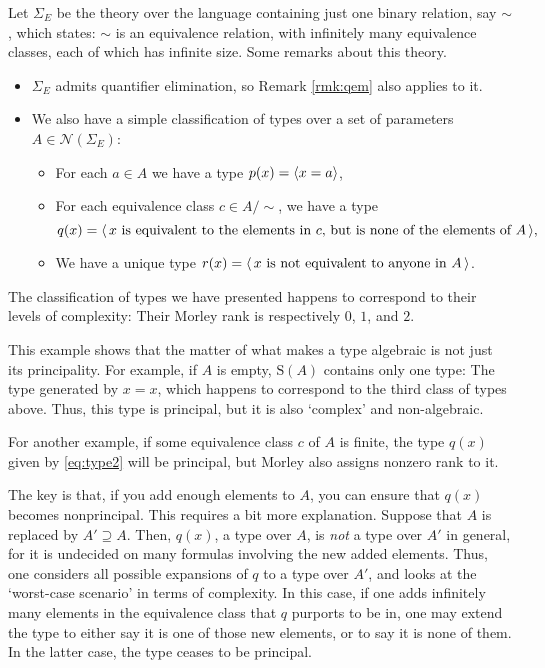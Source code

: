 \documentclass{article}
\theoremstyle{nonumberplain}
\newcommand{\calN}{\mathcal{N}}
\newcommand{\Stone}{\mathrm{S}}
\DeclarePairedDelimiter{\braket}{\langle}{\rangle}
\begin{document}
Let $\Sigma_E$ be the theory over the language containing just one binary relation, say $\sim$, which states: $\sim$ is an equivalence relation, with infinitely many equivalence classes, each of which has infinite size. Some remarks about this theory.
\begin{itemize}
\item $\Sigma_E$ admits quantifier elimination, so Remark \ref{rmk:qem} also applies to it.
\item We also have a simple classification of types over a set of parameters $A \in \calN(\Sigma_E)$:
\begin{itemize}
\item For each $a \in A$ we have a type $p(x) = \braket{x = a}$,
\item For each equivalence class $c \in A/{\sim}$, we have a type
\begin{equation}\label{eq:type2}
q(x) = \braket{\,\text{$x$ is equivalent to the elements in $c$, but is none of the elements of $A$}\,},
\end{equation}
\item We have a unique type $r(x) = \braket{\,\text{$x$ is not equivalent to anyone in $A$}\,}$.
\end{itemize}
\end{itemize}

The classification of types we have presented happens to correspond to their levels of complexity: Their Morley rank is respectively $0$, $1$, and $2$.

This example shows that the matter of what makes a type algebraic is not just its principality. For example, if $A$ is empty, $\Stone(A)$ contains only one type: The type generated by $x = x$, which happens to correspond to the third class of types above. Thus, this type is principal, but it is also `complex' and non-algebraic.

For another example, if some equivalence class $c$ of $A$ is finite, the type $q(x)$ given by \eqref{eq:type2} will be principal, but Morley also assigns nonzero rank to it.

The key is that, if you add enough elements to $A$, you can ensure that $q(x)$ becomes nonprincipal. This requires a bit more explanation. Suppose that $A$ is replaced by $A' \supseteq A$. Then, $q(x)$, a type over $A$, is \emph{not} a type over $A'$ in general, for it is undecided on many formulas involving the new added elements. Thus, one considers all possible expansions of $q$ to a type over $A'$, and looks at the `worst-case scenario' in terms of complexity. In this case, if one adds infinitely many elements in the equivalence class that $q$ purports to be in, one may extend the type to either say it is one of those new elements, or to say it is none of them. In the latter case, the type ceases to be principal.
\end{document}
